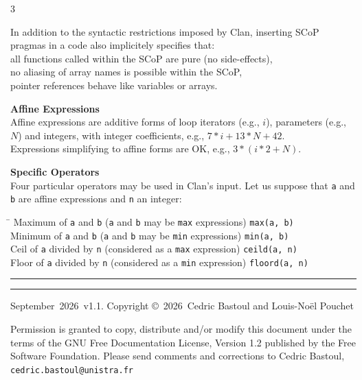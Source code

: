 \documentclass[landscape,a4paper]{article}
\def\versionnumber{1.1}
\def\year{2026}
\def\month{September}
\def\version{\month\ \year\ v\versionnumber}
\begin{document}
\begin{multicols}{3}
\begin{small}
\vspace{0.1cm}
In addition to the syntactic restrictions imposed by Clan, inserting
SCoP pragmas in a code also implicitely specifies that:\\
 all functions called within the SCoP are pure (no side-effects),\\
 no aliasing of array names is possible within the SCoP,\\
 pointer references behave like variables or arrays.

\vspace{0.2cm}
\textbf{Affine Expressions}\\
Affine expressions are additive forms of loop iterators (e.g., $i$),
parameters (e.g., $N$) and integers, with integer coefficients, e.g.,
$7*i + 13*N + 42$.\\
 Expressions simplifying to affine forms are OK, e.g., $3*(i*2 + N)$.

\vspace{0.2cm}
\textbf{Specific Operators}\\
Four particular operators may be used in Clan's input. Let us suppose that
{\tt a} and {\tt b} are affine expressions and {\tt n} an integer:
\vspace{-0.2cm}
\begin{tabbing}
\hskip 205pt \= \kill
Maximum of {\tt a} and {\tt b} ({\tt a} and {\tt b} may be {\tt max} expressions) \> {\tt max(a, b)} \\
Minimum of {\tt a} and {\tt b} ({\tt a} and {\tt b} may be {\tt min} expressions) \> {\tt min(a, b)} \\
Ceil  of {\tt a} divided by {\tt n} (considered as a {\tt max} expression)      \> {\tt ceild(a, n)} \\
Floor of {\tt a} divided by {\tt n} (considered as a {\tt min} expression)      \> {\tt floord(a, n)}
\end{tabbing}
\end{small}

\hrule
\vspace{0.1cm}
\hrule
\begin{scriptsize}
\vspace{0.1cm}
\centerline{\version. Copyright \copyright\ \year\ Cedric Bastoul and Louis-No\"el Pouchet}

Permission is granted to copy, distribute and/or modify this
document under the terms of the GNU Free Documentation License,
Version 1.2 published by the Free Software Foundation.
Please send comments and corrections to Cedric Bastoul, \verb+cedric.bastoul@unistra.fr+


\end{scriptsize}
\end{multicols}
\end{document}
